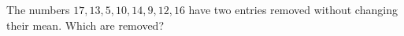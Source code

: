 The numbers $17,13,5,10,14,9,12,16$ have two entries removed without changing their mean. Which are removed?
